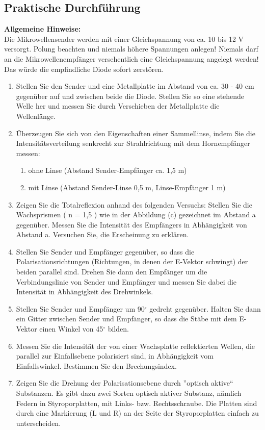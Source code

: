 \documentclass[12pt]{scrartcl}
\begin{document}
\subsection{Praktische Durchführung}
\textbf{Allgemeine Hinweise:}\\
Die Mikrowellensender werden mit einer Gleichspannung von ca. 10 bis 12 V versorgt.
Polung beachten und niemals höhere Spannungen anlegen! Niemals darf an die Mikrowellenempfänger versehentlich eine Gleichspannung angelegt werden! Das würde die empfindliche Diode sofort zerstören.
\begin{enumerate}
\item Stellen Sie den Sender und eine Metallplatte im Abstand von ca. 30 - 40 cm gegenüber auf und zwischen beide die Diode. Stellen Sie so eine stehende Welle her
und messen Sie durch Verschieben der Metallplatte die Wellenlänge.
\item
Überzeugen Sie sich von den Eigenschaften einer Sammellinse, indem Sie die Intensitätsverteilung senkrecht zur Strahlrichtung mit dem Hornempfänger messen:
\begin{enumerate}
\item ohne Linse (Abstand Sender-Empfänger ca. 1,5 m)
\item mit Linse (Abstand Sender-Linse 0,5 m, Linse-Empfänger 1 m)
\end{enumerate}
\item Zeigen Sie die Totalreflexion anhand des folgenden Versuchs:
Stellen Sie die Wachsprismen ( n = 1,5 ) wie in der Abbildung (c) gezeichnet im Abstand a gegenüber. Messen Sie die Intensität des Empfängers in Abhängigkeit von Abstand a. Versuchen Sie, die Erscheinung zu erklären.
\item Stellen Sie Sender und Empfänger gegenüber, so dass die Polarisationsrichtungen
(Richtungen, in denen der E-Vektor schwingt) der beiden parallel sind. Drehen Sie dann den Empfänger um die Verbindungslinie von Sender und Empfänger und messen Sie dabei die Intensität in Abhängigkeit des Drehwinkels.
\item Stellen Sie Sender und Empfänger um 90$^{\circ}$ gedreht gegenüber. Halten Sie dann ein Gitter zwischen Sender und Empfänger, so dass die Stäbe mit dem E-Vektor einen Winkel von 45$^{\circ}$ bilden.
\item Messen Sie die Intensität der von einer Wachsplatte reflektierten Wellen, die parallel zur Einfallsebene polarisiert sind, in Abhängigkeit vom Einfallswinkel. Bestimmen Sie den Brechungsindex.
\item Zeigen Sie die Drehung der Polarisationsebene durch ”optisch aktive“ Substanzen. Es gibt dazu zwei Sorten optisch aktiver Substanz, nämlich Federn in Styroporplatten, mit Links- bzw. Rechtsschraube. Die Platten sind durch eine Markierung (L und R) an der Seite der Styroporplatten einfach zu unterscheiden.
\end{enumerate}
\end{document}

